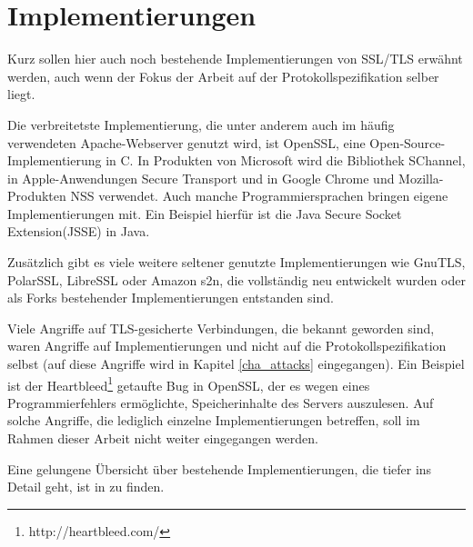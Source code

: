 \section{Implementierungen}

Kurz sollen hier auch noch bestehende Implementierungen von SSL/TLS erwähnt werden, auch wenn der Fokus der Arbeit auf der Protokollspezifikation selber liegt.

Die verbreitetste Implementierung, die unter anderem auch im häufig verwendeten Apache-Webserver genutzt wird, ist OpenSSL, eine Open-Source-Implementierung in C. In Produkten von Microsoft wird die Bibliothek SChannel, in Apple-Anwendungen Secure Transport und in Google Chrome und Mozilla-Produkten NSS verwendet. Auch manche Programmiersprachen bringen eigene Implementierungen mit. Ein Beispiel hierfür ist die Java Secure Socket Extension(JSSE) in Java.

Zusätzlich gibt es viele weitere seltener genutzte Implementierungen wie GnuTLS, PolarSSL, LibreSSL oder Amazon s2n, die vollständig neu entwickelt wurden oder als Forks bestehender Implementierungen entstanden sind.

Viele Angriffe auf TLS-gesicherte Verbindungen, die bekannt geworden sind, waren Angriffe auf Implementierungen und nicht auf die Protokollspezifikation selbst (auf diese Angriffe wird in Kapitel \ref{cha_attacks} eingegangen). Ein Beispiel ist der Heartbleed\footnote{http://heartbleed.com/} getaufte Bug in OpenSSL, der es wegen eines Programmierfehlers ermöglichte, Speicherinhalte des Servers auszulesen. Auf solche Angriffe, die lediglich einzelne Implementierungen betreffen, soll im Rahmen dieser Arbeit nicht weiter eingegangen werden.

Eine gelungene Übersicht über bestehende Implementierungen, die tiefer ins Detail geht, ist in \cite{meyer14} zu finden.
